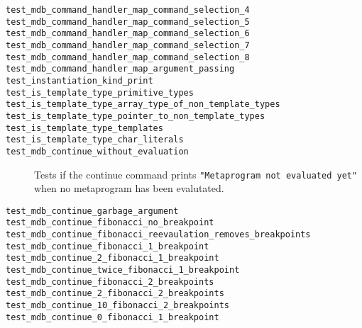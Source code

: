 \begin{description}
    \item[\texttt{test\_mdb\_command\_handler\_map\_command\_selection\_4}]
    \item[\texttt{test\_mdb\_command\_handler\_map\_command\_selection\_5}]
    \item[\texttt{test\_mdb\_command\_handler\_map\_command\_selection\_6}]
    \item[\texttt{test\_mdb\_command\_handler\_map\_command\_selection\_7}]
    \item[\texttt{test\_mdb\_command\_handler\_map\_command\_selection\_8}]
    \item[\texttt{test\_mdb\_command\_handler\_map\_argument\_passing}]
    \item[\texttt{test\_instantiation\_kind\_print}]
    \item[\texttt{test\_is\_template\_type\_primitive\_types}]
    \item[\texttt{test\_is\_template\_type\_array\_type\_of\_non\_template\_types}]
    \item[\texttt{test\_is\_template\_type\_pointer\_to\_non\_template\_types}]
    \item[\texttt{test\_is\_template\_type\_templates}]
    \item[\texttt{test\_is\_template\_type\_char\_literals}]
    \item[\texttt{test\_mdb\_continue\_without\_evaluation}]
        Tests if the continue command prints
        \texttt{"Metaprogram not evaluated yet"} when no metaprogram has been
        evalutated.
    \item[\texttt{test\_mdb\_continue\_garbage\_argument}]
    \item[\texttt{test\_mdb\_continue\_fibonacci\_no\_breakpoint}]
    \item[\texttt{test\_mdb\_continue\_fibonacci\_reevaulation\_removes\_breakpoints}]
    \item[\texttt{test\_mdb\_continue\_fibonacci\_1\_breakpoint}]
    \item[\texttt{test\_mdb\_continue\_2\_fibonacci\_1\_breakpoint}]
    \item[\texttt{test\_mdb\_continue\_twice\_fibonacci\_1\_breakpoint}]
    \item[\texttt{test\_mdb\_continue\_fibonacci\_2\_breakpoints}]
    \item[\texttt{test\_mdb\_continue\_2\_fibonacci\_2\_breakpoints}]
    \item[\texttt{test\_mdb\_continue\_10\_fibonacci\_2\_breakpoints}]
    \item[\texttt{test\_mdb\_continue\_0\_fibonacci\_1\_breakpoint}]

\end{description}
